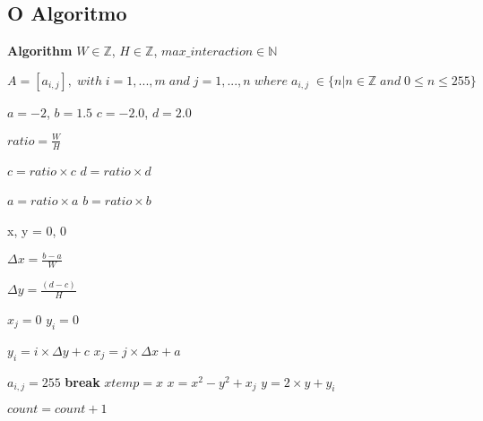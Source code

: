 \documentclass[12pt,a4paper]{article}
\begin{document}
	
	
	
	\newpage
	
	\subsection{O Algoritmo}

	\begin{algorithmic}[1]
		\STATE \textbf{Algorithm} 
		\STATE $W \in \mathbb{Z}$, $H \in \mathbb{Z}$, $max\_interaction \in \mathbb{N}$
		\STATE {}

		
		\STATE $ A = [a_{i,j}], \; with \; i=1,...,m \; and \; j=1,...,n \; where \; a_{i,j}  \;\in \{ n | n \in \mathbb{Z} \; and \; 0 \leq n \leq 255 \}$
		
		\STATE $a = -2$, $b = 1.5$
		\STATE $c = -2.0$, $d = 2.0$ 

		\STATE {}
		\STATE  $ratio = \frac{W}{H}$ 
		
		
			\STATE $c = ratio \times c$
			\STATE $d = ratio \times d$
			
		\ELSE 
			\STATE $a = ratio \times a$
			\STATE $b = ratio \times b$
		\ENDIF

		 
		 \STATE x, y = 0, 0 
		 
		 \STATE $ \Delta x = \frac{b - a}{W}$ 

		 
		 \STATE $ \Delta y = \frac{( d - c)}{H} $ 
		 
		 \STATE $ x_j = 0 $
		 \STATE $y_i = 0$  
		 
		 	\STATE $y_i = i\times \Delta y + c$
		 		\STATE $x_j = j \times \Delta x + a$
		 		
		 				\STATE $a_{i,j} = 255$ 
		 				\STATE \textbf{break}  
		 			\ENDIF
		 			\STATE $xtemp = x$
		 			\STATE $x =  x^2 - y^2 + x_j$
		 			\STATE $y = 2 \times y + y_i$
		 			
		 			\STATE $count = count + 1$
				\ENDWHILE
			\ENDFOR
		\ENDFOR
	\end{algorithmic}
	
\end{document}
